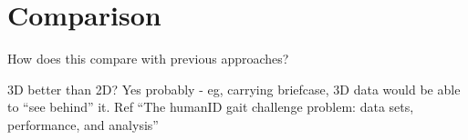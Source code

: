 \section{Comparison}
How does this compare with previous approaches?

3D better than 2D?
Yes probably - eg, carrying briefcase, 3D data would be able to ``see behind'' it. Ref ``The humanID gait challenge problem: data sets, performance, and analysis''